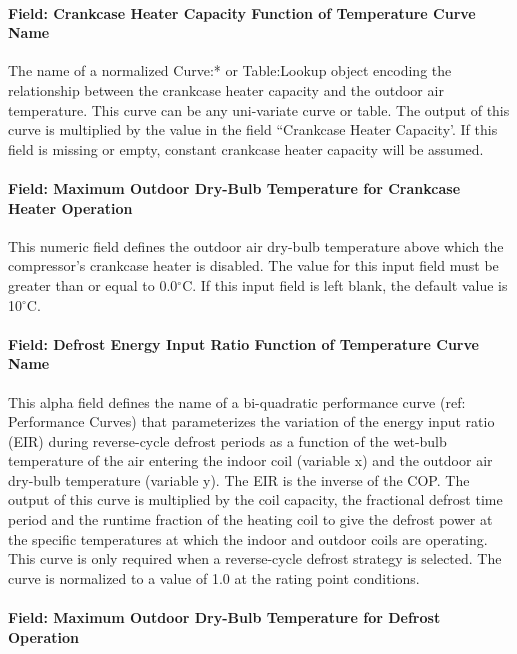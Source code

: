 \paragraph{Field: Crankcase Heater Capacity Function of Temperature Curve Name}

The name of a normalized Curve:* or Table:Lookup object encoding the relationship between the crankcase heater capacity and the outdoor air temperature. This curve can be any uni-variate curve or table. The output of this curve is multiplied by the value in the field ``Crankcase Heater Capacity'. If this field is missing or empty, constant crankcase heater capacity will be
assumed.

\paragraph{Field: Maximum Outdoor Dry-Bulb Temperature for Crankcase Heater Operation}\label{field-maximum-outdoor-dry-bulb-temperature-for-crankcase-heater-operation-5}

This numeric field defines the outdoor air dry-bulb temperature above which the compressor's crankcase heater is disabled. The value for this input field must be greater than or equal to 0.0$^\circ$C. If this input field is left blank, the default value is 10$^\circ$C.

\paragraph{Field: Defrost Energy Input Ratio Function of Temperature Curve Name}\label{field-defrost-energy-input-ratio-function-of-temperature-curve-name-1}

This alpha field defines the name of a bi-quadratic performance curve (ref: Performance Curves) that parameterizes the variation of the energy input ratio (EIR) during reverse-cycle defrost periods as a function of the wet-bulb temperature of the air entering the indoor coil (variable x) and the outdoor air dry-bulb temperature (variable y). The EIR is the inverse of the COP. The output of this curve is multiplied by the coil capacity, the fractional defrost time period and the runtime fraction of the heating coil to give the defrost power at the specific temperatures at which the indoor and outdoor coils are operating. This curve is only required when a reverse-cycle defrost strategy is selected. The curve is normalized to a value of 1.0 at the rating point conditions.

\paragraph{Field: Maximum Outdoor Dry-Bulb Temperature for Defrost Operation}\label{field-maximum-outdoor-dry-bulb-temperature-for-defrost-operation-1}

